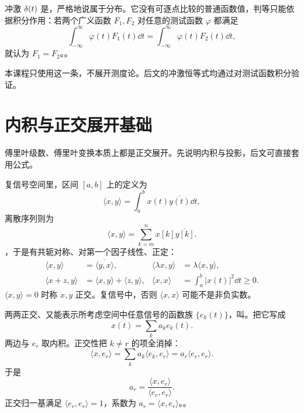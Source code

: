 冲激 $\delta(t)$ 是，严格地说属于分布。它没有可逐点比较的普通函数值，判等只能依据积分作用：若两个广义函数 $F_1,F_2$ 对任意的测试函数 $\varphi$ 都满足
\begin{equation}
  \int_{-\infty}^{\infty}\varphi(t)F_1(t)\dd t
  =\int_{-\infty}^{\infty}\varphi(t)F_2(t)\dd t,
  \label{eq:distribution-equality}
\end{equation}
就认为 $F_1=F_2$。。

本课程只使用这一条，不展开测度论。后文的冲激恒等式均通过对测试函数积分验证。

\section{内积与正交展开基础}
\label{sec:inner-product-foundations}

傅里叶级数、傅里叶变换本质上都是正交展开。先说明内积与投影，后文可直接套用公式。

复信号空间里，区间 $[a,b]$ 上的定义为
\begin{equation}
  \langle x,y\rangle
  =\int_a^b x(t)\overline{y(t)}\dd t,
  \label{eq:continuous-signal-inner-product}
\end{equation}
离散序列则为
\begin{equation}
  \langle x,y\rangle
  =\sum_{k=m}^{n}x[k]\overline{y[k]}.
  \label{eq:discrete-signal-inner-product}
\end{equation}
，于是有共轭对称、对第一个因子线性、正定：
\begin{align*}
  \langle x,y\rangle&=\overline{\langle y,x\rangle},&
  \langle \lambda x,y\rangle&=\lambda\langle x,y\rangle,\\
  \langle x+z,y\rangle&=\langle x,y\rangle+\langle z,y\rangle,&
  \langle x,x\rangle&=\int_a^b|x(t)|^2\dd t\geq0.
\end{align*}
$\langle x,y\rangle=0$ 时称 $x,y$ 正交。复信号中，否则 $\langle x,x\rangle$ 可能不是非负实数。

两两正交、又能表示所考虑空间中任意信号的函数族 $\{e_k(t)\}$，叫。把它写成
\begin{equation}
  x(t)=\sum_k a_k e_k(t).
  \label{eq:orthogonal-expansion}
\end{equation}
两边与 $e_r$ 取内积。正交性把 $k\ne r$ 的项全消掉：
\[
  \langle x,e_r\rangle
  =\sum_k a_k\langle e_k,e_r\rangle
  =a_r\langle e_r,e_r\rangle.
\]
于是
\begin{equation}
  \boxed{a_r=\frac{\langle x,e_r\rangle}{\langle e_r,e_r\rangle}}.
  \label{eq:orthogonal-projection-coefficient}
\end{equation}
正交归一基满足 $\langle e_r,e_r\rangle=1$，系数为 $a_r=\langle x,e_r\rangle$。。

